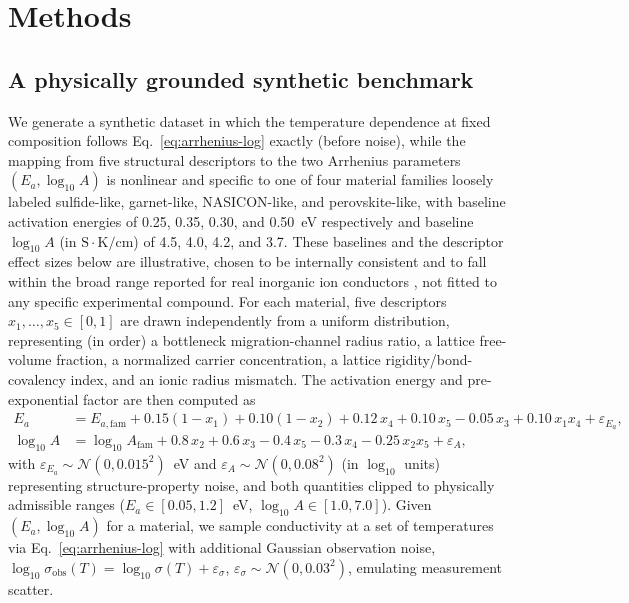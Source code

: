 \documentclass[11pt]{article}
\begin{document}
\section{Methods}
\label{sec:methods}

\subsection{A physically grounded synthetic benchmark}

We generate a synthetic dataset in which the temperature dependence at fixed composition follows Eq.~\ref{eq:arrhenius-log} exactly (before noise), while the mapping from five structural descriptors to the two Arrhenius parameters $(E_a, \log_{10}A)$ is nonlinear and specific to one of four material families loosely labeled sulfide-like, garnet-like, NASICON-like, and perovskite-like, with baseline activation energies of 0.25, 0.35, 0.30, and 0.50~eV respectively and baseline $\log_{10}A$ (in $\mathrm{S{\cdot}K/cm}$) of 4.5, 4.0, 4.2, and 3.7. These baselines and the descriptor effect sizes below are illustrative, chosen to be internally consistent and to fall within the broad range reported for real inorganic ion conductors \citep{famprikis2019fundamentals}, not fitted to any specific experimental compound. For each material, five descriptors $x_1,\dots,x_5 \in [0,1]$ are drawn independently from a uniform distribution, representing (in order) a bottleneck migration-channel radius ratio, a lattice free-volume fraction, a normalized carrier concentration, a lattice rigidity/bond-covalency index, and an ionic radius mismatch. The activation energy and pre-exponential factor are then computed as
\begin{align}
E_a &= E_{a,\text{fam}} + 0.15(1-x_1) + 0.10(1-x_2) + 0.12\,x_4 + 0.10\,x_5 - 0.05\,x_3 + 0.10\,x_1x_4 + \varepsilon_{E_a}, \\
\log_{10}A &= \log_{10}A_{\text{fam}} + 0.8\,x_2 + 0.6\,x_3 - 0.4\,x_5 - 0.3\,x_4 - 0.25\,x_2x_5 + \varepsilon_{A},
\end{align}
with $\varepsilon_{E_a}\sim\mathcal N(0, 0.015^2)$~eV and $\varepsilon_A\sim\mathcal N(0,0.08^2)$ (in $\log_{10}$ units) representing structure-property noise, and both quantities clipped to physically admissible ranges ($E_a \in [0.05, 1.2]$~eV, $\log_{10}A \in [1.0, 7.0]$). Given $(E_a, \log_{10}A)$ for a material, we sample conductivity at a set of temperatures via Eq.~\ref{eq:arrhenius-log} with additional Gaussian observation noise, $\log_{10}\sigma_{\text{obs}}(T) = \log_{10}\sigma(T) + \varepsilon_\sigma$, $\varepsilon_\sigma \sim \mathcal N(0, 0.03^2)$, emulating measurement scatter.
\end{document}
